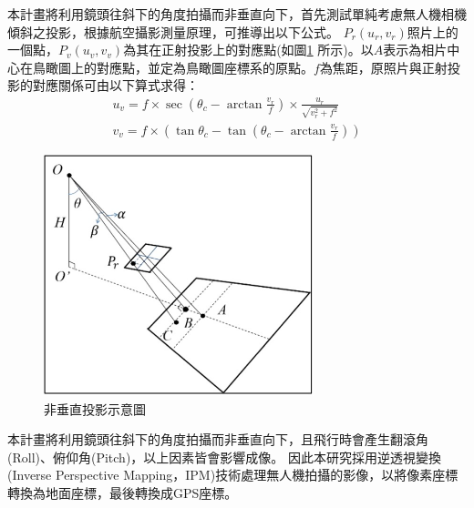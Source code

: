 \documentclass[12pt]{article}       %
\renewcommand{\figurename}{圖}                           %
\begin{document}
本計畫將利用鏡頭往斜下的角度拍攝而非垂直向下，首先測試單純考慮無人機相機傾斜之投影，根據航空攝影測量原理\cite{zhao2013}，可推導出以下公式。
$P_{r}(u_{r},v_{r})$照片上的一個點，$P_{v}(u_{v},v_{v})$為其在正射投影上的對應點(如圖\ref{fig:ipm} 所示)。以$A$表示為相片中心在鳥瞰圖上的對應點，並定為鳥瞰圖座標系的原點。$f$為焦距，原照片與正射投影的對應關係可由以下算式求得：
\begin{align}
    u_{v}=f\times\sec(\theta_{c}-\arctan\frac{v_{r}}{f})\times\frac{u_{r}}{\sqrt{v^2_{r}+f^2}} 
    \label{eq:uv}
    \\
    \label{eq:vv}        
    v_{v}=f\times(\tan\theta_{c}-\tan(\theta_{c}-\arctan\frac{v_{r}}{f}))              
\end{align}
\begin{figure}[H]
    \centering
    \renewcommand{\figurename}{圖}                              %
    \includegraphics[width=0.7\textwidth]{ipm.jpg}         %
    \caption{非垂直投影示意圖\cite{tsao2018}}           %
    \label{fig:ipm}                                        %
\end{figure}

本計畫將利用鏡頭往斜下的角度拍攝而非垂直向下，且飛行時會產生翻滾角 (Roll)、俯仰角(Pitch)，以上因素皆會影響成像。
因此本研究採用逆透視變換(Inverse Perspective Mapping，IPM)\cite{lin_2001}\cite{bertozz1998stereo}\cite{mallot1991inverse}技術處理無人機拍攝的影像，以將像素座標轉換為地面座標，最後轉換成GPS座標。
\end{document}
